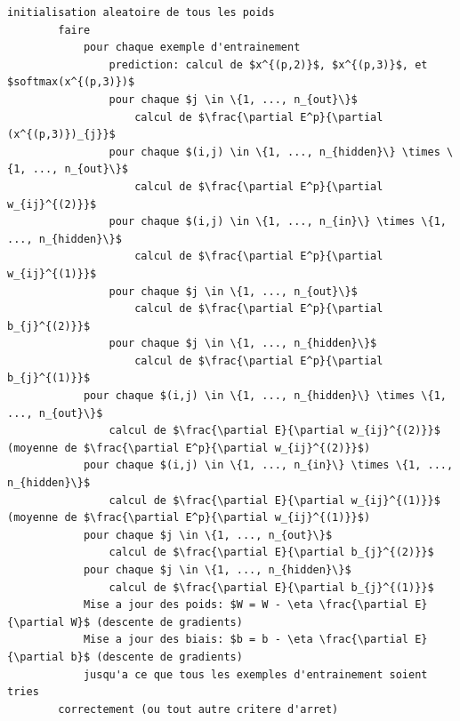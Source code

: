 \documentclass[a4paper,11pt,oneside,roman]{article}
\begin{document}
    \begin{lstlisting}[mathescape]
        initialisation aleatoire de tous les poids
        faire
            pour chaque exemple d'entrainement
                prediction: calcul de $x^{(p,2)}$, $x^{(p,3)}$, et $softmax(x^{(p,3)})$
                pour chaque $j \in \{1, ..., n_{out}\}$
                    calcul de $\frac{\partial E^p}{\partial (x^{(p,3)})_{j}}$
                pour chaque $(i,j) \in \{1, ..., n_{hidden}\} \times \{1, ..., n_{out}\}$
                    calcul de $\frac{\partial E^p}{\partial w_{ij}^{(2)}}$
                pour chaque $(i,j) \in \{1, ..., n_{in}\} \times \{1, ..., n_{hidden}\}$
                    calcul de $\frac{\partial E^p}{\partial w_{ij}^{(1)}}$
                pour chaque $j \in \{1, ..., n_{out}\}$
                    calcul de $\frac{\partial E^p}{\partial b_{j}^{(2)}}$
                pour chaque $j \in \{1, ..., n_{hidden}\}$
                    calcul de $\frac{\partial E^p}{\partial b_{j}^{(1)}}$
            pour chaque $(i,j) \in \{1, ..., n_{hidden}\} \times \{1, ..., n_{out}\}$
                calcul de $\frac{\partial E}{\partial w_{ij}^{(2)}}$ (moyenne de $\frac{\partial E^p}{\partial w_{ij}^{(2)}}$)
            pour chaque $(i,j) \in \{1, ..., n_{in}\} \times \{1, ..., n_{hidden}\}$
                calcul de $\frac{\partial E}{\partial w_{ij}^{(1)}}$ (moyenne de $\frac{\partial E^p}{\partial w_{ij}^{(1)}}$)
            pour chaque $j \in \{1, ..., n_{out}\}$
                calcul de $\frac{\partial E}{\partial b_{j}^{(2)}}$
            pour chaque $j \in \{1, ..., n_{hidden}\}$
                calcul de $\frac{\partial E}{\partial b_{j}^{(1)}}$
            Mise a jour des poids: $W = W - \eta \frac{\partial E}{\partial W}$ (descente de gradients)
            Mise a jour des biais: $b = b - \eta \frac{\partial E}{\partial b}$ (descente de gradients)
            jusqu'a ce que tous les exemples d'entrainement soient tries 
        correctement (ou tout autre critere d'arret)
    \end{lstlisting}

    
\end{document}
